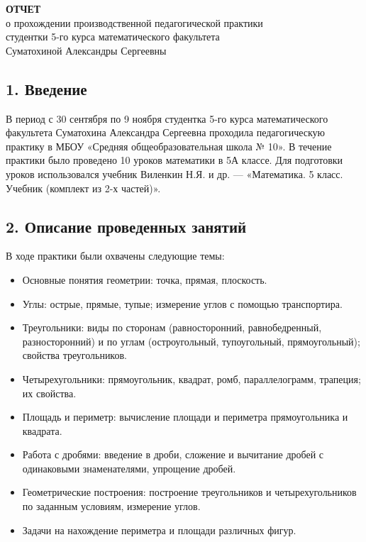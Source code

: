 \documentclass[a4paper,12pt]{article}
\begin{document}
\begin{center}
\textbf{ОТЧЕТ}\\
о прохождении производственной педагогической практики\\
студентки 5-го курса математического факультета\\
Суматохиной Александры Сергеевны
\end{center}

\subsection*{1. Введение}

В период с 30 сентября по 9 ноября студентка 5-го курса математического факультета Суматохина Александра Сергеевна проходила педагогическую практику в МБОУ «Средняя общеобразовательная школа № 10». В течение практики было проведено 10 уроков математики в 5А классе. Для подготовки уроков использовался учебник Виленкин Н.Я. и др. — «Математика. 5 класс. Учебник (комплект из 2-х частей)».

\subsection*{2. Описание проведенных занятий}

В ходе практики были охвачены следующие темы:

\begin{itemize}
    \item Основные понятия геометрии: точка, прямая, плоскость.
    \item Углы: острые, прямые, тупые; измерение углов с помощью транспортира.
    \item Треугольники: виды по сторонам (равносторонний, равнобедренный, разносторонний) и по углам (остроугольный, тупоугольный, прямоугольный); свойства треугольников.
    \item Четырехугольники: прямоугольник, квадрат, ромб, параллелограмм, трапеция; их свойства.
    \item Площадь и периметр: вычисление площади и периметра прямоугольника и квадрата.
    \item Работа с дробями: введение в дроби, сложение и вычитание дробей с одинаковыми знаменателями, упрощение дробей.
    \item Геометрические построения: построение треугольников и четырехугольников по заданным условиям, измерение углов.
    \item Задачи на нахождение периметра и площади различных фигур.
\end{itemize}
\end{document}
